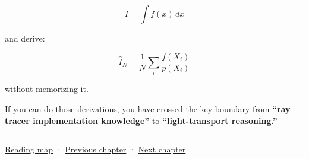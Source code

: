 \[
I=\int f(x)\,dx
\]

and derive:

\[
\boxed{
\hat I_N
=
\frac1N
\sum_i
\frac{f(X_i)}{p(X_i)}
}
\]

without memorizing it.

If you can do those derivations, you have crossed the key boundary from \textbf{``ray tracer implementation knowledge''} to \textbf{``light-transport reasoning.''}

\begin{center}\rule{0.5\linewidth}{0.5pt}\end{center}

\hyperref[volume-reading-map]{Reading map} · \hyperref[03-visual-computing-i-ch006-from-material-data-to-gpu-bindings]{Previous chapter} · \hyperref[03-visual-computing-i-ch008-sampling-directions-and-light-transport]{Next chapter}
